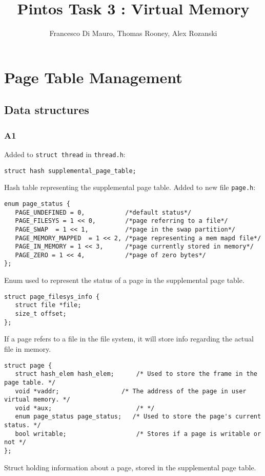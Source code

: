 \documentclass[a4wide, 11pt]{article}
\newcommand{\tx}{\texttt}
\begin{document}
\title{Pintos Task 3 : Virtual Memory}
\author{Francesco Di Mauro, Thomas Rooney, Alex Rozanski}

\maketitle

\section{Page Table Management}
\subsection{Data structures}
\subsubsection{A1}
Added to \tx{struct thread} in \tx{thread.h}:
\begin{verbatim}
struct hash supplemental_page_table;
\end{verbatim}
Hash table representing the supplemental page table.
Added to new file \tx{page.h}:
\begin{verbatim}
enum page_status {
   PAGE_UNDEFINED = 0,           /*default status*/
   PAGE_FILESYS = 1 << 0,        /*page referring to a file*/
   PAGE_SWAP  = 1 << 1,          /*page in the swap partition*/
   PAGE_MEMORY_MAPPED  = 1 << 2, /*page representing a mem mapd file*/
   PAGE_IN_MEMORY = 1 << 3,      /*page currently stored in memory*/
   PAGE_ZERO = 1 << 4,           /*page of zero bytes*/
};
\end{verbatim}
Enum used to represent the status of a page in the supplemental page table.

\begin{verbatim}
struct page_filesys_info {
   struct file *file;
   size_t offset;
};
\end{verbatim}
If a page refers to a file in the file system, it will store info regarding the actual file in memory.


\begin{verbatim}
struct page {
   struct hash_elem hash_elem;		/* Used to store the frame in the page table. */
   void *vaddr;	    			/* The address of the page in user virtual memory. */
   void *aux;						/* */
   enum page_status page_status;   /* Used to store the page's current status. */
   bool writable;					/* Stores if a page is writable or not */
};
\end{verbatim}
Struct holding information about a page, stored in the supplemental page table.
\end{document}
